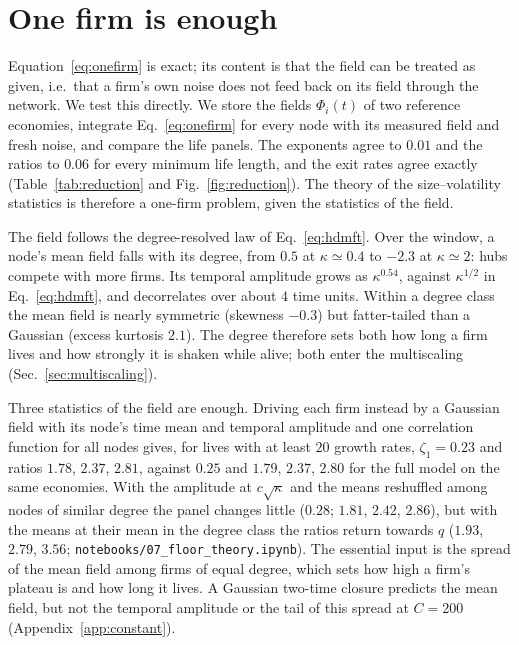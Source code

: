 \documentclass[pre,twocolumn,superscriptaddress,nofootinbib]{revtex4-2}
\begin{document}
\section{One firm is enough}
\label{sec:onefirm}

Equation~\eqref{eq:onefirm} is exact; its content is that the field can be treated as given, i.e.\
that a firm's own noise does not feed back on its field through the network.  We test this
directly.  We store the fields $\Phi_i(t)$ of two reference economies, integrate
Eq.~\eqref{eq:onefirm} for every node with its measured field and fresh noise, and compare the life
panels.  The exponents agree to $0.01$ and the ratios to $0.06$ for every minimum life length, and the
exit rates agree exactly (Table~\ref{tab:reduction} and Fig.~\ref{fig:reduction}).  The theory of the
size--volatility statistics is therefore a one-firm problem, given the statistics of the field.


The field follows the degree-resolved law of Eq.~\eqref{eq:hdmft}.  Over the window, a node's mean field
falls with its degree, from $0.5$ at $\kappa\simeq0.4$ to $-2.3$ at $\kappa\simeq2$: hubs compete with more
firms.  Its temporal amplitude grows as $\kappa^{0.54}$, against $\kappa^{1/2}$ in Eq.~\eqref{eq:hdmft},
and decorrelates over about $4$ time units.  Within a degree class the mean field is nearly
symmetric (skewness $-0.3$) but fatter-tailed than a Gaussian (excess kurtosis $2.1$).  The degree therefore sets both how long a firm lives and how strongly it
is shaken while alive; both enter the multiscaling (Sec.~\ref{sec:multiscaling}).

Three statistics of the field are enough.  Driving each firm instead by a Gaussian field with its node's
time mean and temporal amplitude and one correlation function for all nodes gives, for lives with at least
$20$ growth rates, $\zeta_1=0.23$ and ratios $1.78$, $2.37$, $2.81$, against $0.25$ and $1.79$, $2.37$, $2.80$ for
the full model on the same economies.  With the amplitude at $c\sqrt\kappa$ and the means reshuffled among
nodes of similar degree the panel changes little ($0.28$; $1.81$, $2.42$, $2.86$), but with the means at their
mean in the degree class the ratios return towards $q$ ($1.93$, $2.79$, $3.56$;
\texttt{notebooks/07\_floor\_theory.ipynb}).  The essential input is the spread of the mean field among firms
of equal degree, which sets how high a firm's plateau is and how long it lives.  A Gaussian two-time
closure predicts the mean field, but not the temporal amplitude or the tail of this spread at $C=200$
(Appendix~\ref{app:constant}).
\end{document}
